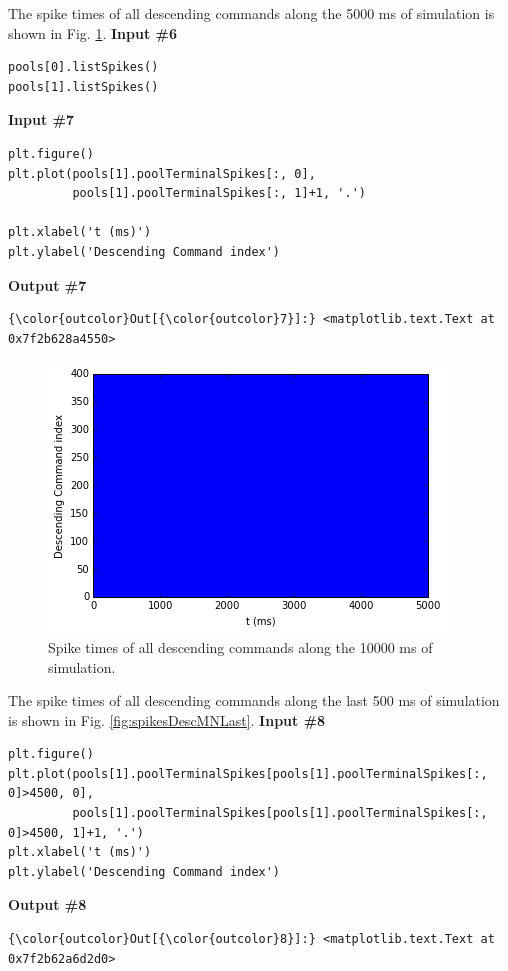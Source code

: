 \documentclass{article}
\makeatletter
\def\maxwidth{\ifdim\Gin@nat@width>\linewidth\linewidth
    \else\Gin@nat@width\fi}
\let\Oldincludegraphics\includegraphics
\renewcommand{\includegraphics}[1]{\Oldincludegraphics[width=.8\maxwidth]{#1}}
\makeatother
\begin{document}
    The spike times of all descending commands along the 5000 ms of
simulation is shown in Fig. \ref{fig:spikesDescMN}.
\newline\textbf{Input \#{}6}\begin{verbatim}
pools[0].listSpikes()
pools[1].listSpikes()
\end{verbatim}\newline\textbf{Input \#{}7}\begin{verbatim}
plt.figure()
plt.plot(pools[1].poolTerminalSpikes[:, 0],
         pools[1].poolTerminalSpikes[:, 1]+1, '.')

plt.xlabel('t (ms)')
plt.ylabel('Descending Command index')
\end{verbatim}\textbf{Output \#{}7}
            \begin{Verbatim}[commandchars=\\\{\}]
{\color{outcolor}Out[{\color{outcolor}7}]:} <matplotlib.text.Text at 0x7f2b628a4550>
\end{Verbatim}
        
    \begin{figure}
        \begin{center}
        \includegraphics{MNPoolWithDescendingCommand_files/MNPoolWithDescendingCommand_8_1.png}
        \end{center}
        \caption{Spike times of all descending commands along the 10000 ms of simulation.}
        \label{fig:spikesDescMN}
    \end{figure}
    
    The spike times of all descending commands along the last 500 ms of
simulation is shown in Fig. \ref{fig:spikesDescMNLast}.
\newline\textbf{Input \#{}8}\begin{verbatim}
plt.figure()
plt.plot(pools[1].poolTerminalSpikes[pools[1].poolTerminalSpikes[:, 0]>4500, 0],
         pools[1].poolTerminalSpikes[pools[1].poolTerminalSpikes[:, 0]>4500, 1]+1, '.')
plt.xlabel('t (ms)')
plt.ylabel('Descending Command index')
\end{verbatim}\textbf{Output \#{}8}
            \begin{Verbatim}[commandchars=\\\{\}]
{\color{outcolor}Out[{\color{outcolor}8}]:} <matplotlib.text.Text at 0x7f2b62a6d2d0>
\end{Verbatim}
        
\end{document}
